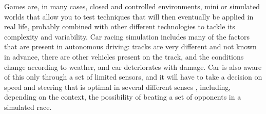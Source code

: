 \documentclass[10pt,journal,compsoc]{IEEEtran}
\begin{document}
\maketitle


\IEEEdisplaynontitleabstractindextext



%
\IEEEpeerreviewmaketitle




Games are, in many cases, closed and controlled environments, mini or
simulated worlds that allow you to test techniques that will then
eventually be applied in real life, probably combined with other
different technologies to tackle its complexity and variability. Car
racing simulation includes many of the factors that are present in
autonomous driving: tracks are very different and not known in
advance, there are other vehicles present on the track, and the
conditions change according to weather, and car deteriorates with
damage. Car is also aware of this only through a set of limited
sensors, and it will have to take a decision on speed and steering that is optimal in several different senses \cite{Autodriv2006}, including, depending on the context, the possibility of beating a set of opponents in a simulated race.
\end{document}
